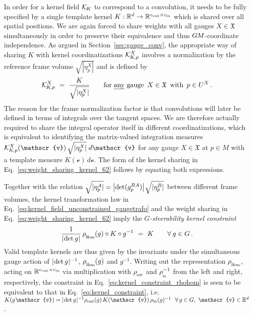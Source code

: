 In order for a kernel field $\mathcal{K}_{\mkern-2mu K}$ to correspond to a convolution, it needs to be fully specified by a single template kernel $K: \mathbb{R}^d \to \mathbb{R}^{{c_\textup{out}}\times{c_\textup{in}}}$ which is shared over all spatial positions.
We are again forced to share weights with all gauges $X \in \mathfrak{X}$ simultaneously in order to preserve their equivalence and thus $G\mkern-1.4muM$-coordinate independence.
As argued in Section~\ref{sec:gauge_conv}, the appropriate way of sharing $K$ with kernel coordinatizations $\mathcal{K}_{\mkern-2mu K \mkern-2mu, p}^X$ involves a normalization by the reference frame volume $\sqrt{|\eta_p^X|}$ and is defined by
\begin{align}\label{eq:weight_sharing_kernel_62}
    \KKp^X\ =\ \frac{K}{\sqrt{|\eta_p^X|}}
    \qquad \textup{for \emph{any} gauge}\,\ X \in \mathfrak{X}\,\ \textup{with}\,\ p\in U^X \,.
\end{align}
The reason for the frame normalization factor is that convolutions will later be defined in terms of integrals over the tangent spaces.
We are therefore actually required to share the integral operator itself in different coordinatizations,
which is equivalent to identifying the matrix-valued integration measures $\KKp^X(\mathscr{v})\, \sqrt{|\eta_p^X|}\; d\mathscr{v}$ for any gauge $X \in \mathfrak{X}$ at $p\in M$ with a template measure $K(\mathscr{v})\, d\mathscr{v}$.
The form of the kernel sharing in Eq.~\eqref{eq:weight_sharing_kernel_62} follows by equating both expressions.


Together with the relation $\sqrt{|\eta_p^A|} = \big|\!\det(g_p^{BA})\big| \mkern1.5mu \sqrt{|\eta_p^B|}$ between different frame volumes, the kernel transformation law in Eq.~\eqref{eq:kernel_field_unconstrained_gaugetrafo} and the weight sharing in Eq.~\eqref{eq:weight_sharing_kernel_62} imply the \emph{$G$-steerability kernel constraint}
\begin{align}\label{eq:kernel_constraint_rhohom}
    \frac{1}{\detg} \, \rhoHom(g) \circ K \circ g^{-1}\ =\ K \qquad\forall\: g\in G \,.
\end{align}
Valid template kernels are thus given by the invariants under the simultaneous gauge action of $|\mkern-2mu \det g \mkern1mu|^{-1}$, $\rhoHom(g)$ and $g^{-1}$.
Writing out the representation $\rhoHom$, acting on $\mathbb{R}^{{c_\textup{out}}\times{c_\textup{in}}}$ via multiplication with $\rhoout$ and $\rhoin^{-1}$ from the left and right, respectively, the constraint in Eq.~\eqref{eq:kernel_constraint_rhohom} is seen to be equivalent to that in Eq.~\eqref{eq:kernel_constraint}, i.e.
$K(g\mkern1mu\mathscr{v}) = \detg^{-1} \rho_\text{out}(g)\, K(\mathscr{v})\, \rho_\text{in}(g)^{-1} \ \ \forall\, g\in G,\ \mathscr{v}\in\R^d$.

